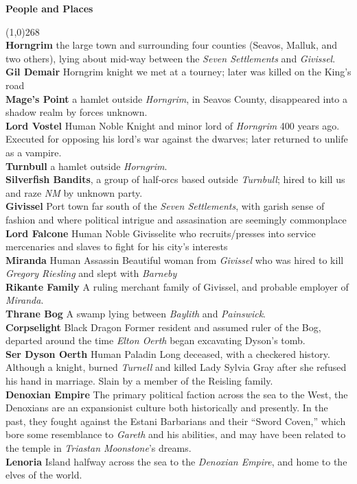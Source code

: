 \documentclass[letterpaper]{article}
\newcommand{\colline}{\line(1,0){268} \\}
\newcommand{\e}[1]{\emph{#1}}
\newcommand{\B}[1]{\textbf{#1}}
\newenvironment{notesection}[1]
{ {\huge \B{#1}} \par
\vspace{-0.75em}
\colline
\begingroup\fontsize{9pt}{12pt}\selectfont}
{\endgroup}
\newcommand{\person}[3]{\B{#1
    \ifstrequal{#2}{M}{{\color{ProcessBlue}\male}}{%
    \ifstrequal{#2}{F}{\color{VioletRed}\female}{}}}{\scriptsize #3}}
\begin{document}
\begin{notesection}{People and Places}
\B{Horngrim} the large town and surrounding four counties (Seavos, Malluk, and two others), lying about mid-way between the \e{Seven Settlements} and \e{Givissel}.\\
\person{Gil Demair} \e{Horngrim} knight we met at a tourney; later was killed on the King's road\\
\B{Mage's Point} a hamlet outside \e{Horngrim}, in Seavos County, disappeared into a shadow realm by forces unknown.\\
\person{Lord Vostel}{M}{Human Noble} Knight and minor lord of \e{Horngrim} 400 years ago. Executed for opposing his lord's war against the dwarves; later returned to unlife as a vampire.\\
\B{Turnbull} a hamlet outside \e{Horngrim}.\\
\B{Silverfish Bandits}, a group of half-orcs based outside \e{Turnbull}; hired to kill us and raze \e{NM} by unknown party.\\

\B{Givissel} Port town far south of the \e{Seven Settlements}, with garish sense of fashion and where political intrigue and assasination are seemingly commonplace \\
\person{Lord Falcone}{M}{Human Noble} Givisselite who recruits/presses into service mercenaries and slaves to fight for his city's interests\\
\person{Miranda}{F}{Human Assassin} Beautiful woman from \e{Givissel} who was hired to kill \e{Gregory Riesling} and slept with \e{Barneby} \\
\B{Rikante Family} A ruling merchant family of Givissel, and probable employer of \e{Miranda}.\\

\B{Thrane Bog} A swamp lying between \e{Baylith} and \e{Painswick}.\\
\person{Corpselight}{F}{Black Dragon} Former resident and assumed ruler of the Bog, departed around the time \e{Elton Oerth} began excavating Dyson's tomb.\\
\person{Ser Dyson Oerth}{M}{Human Paladin} Long deceased, with a checkered history. Although a knight, burned \e{Turnell} and killed Lady Sylvia Gray after she refused his hand in marriage. Slain by a member of the Reisling family.\\

\B{Denoxian Empire} The primary political faction across the sea to the West, the Denoxians are an expansionist culture both historically and presently. In the past, they fought against the Estani Barbarians and their ``Sword Coven,'' which bore some resemblance to \e{Gareth} and his abilities, and may have been related to the temple in \e{Triastan Moonstone}'s dreams.\\
\B{Lenoria} Island halfway across the sea to the \e{Denoxian Empire}, and home to the elves of the world.\\
\end{notesection}
\end{document}
